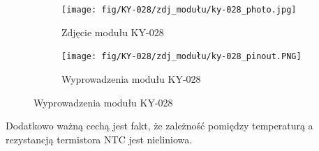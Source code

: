 \documentclass[11pt, a4paper]{article}
\begin{document}
\begin{figure}[h]
\centering
\begin{subfigure}{.5\textwidth}
\centering
\texttt{[image: fig/KY-028/zdj\_modułu/ky-028\_photo.jpg]}
\caption{Zdjęcie modułu KY-028}
\label{fig:_zdjecie_modulu}
\end{subfigure}%
\begin{subfigure}{.5\textwidth}
\centering
\texttt{[image: fig/KY-028/zdj\_modułu/ky-028\_pinout.PNG]}
\caption{Wyprowadzenia modułu KY-028}
\label{fig:_schemat_modulu}
\end{subfigure}
\label{fig:modul}
\end{figure}
\vspace{0.5cm}

Dodatkowo ważną cechą jest fakt, że zależność pomiędzy temperaturą a rezystancją termistora NTC jest nieliniowa.
\end{document}
